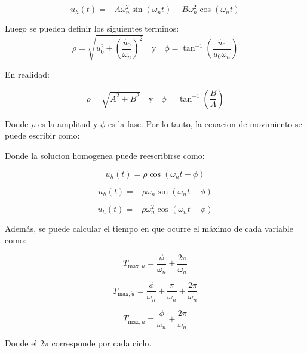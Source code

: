 \documentclass{article}  %
\begin{document}
\begin{equation}
    \ddot{u}_h(t) = -A \omega_n^2 \sin(\omega_n t) - B \omega_n^2 \cos(\omega_n t)
\end{equation}

Luego se pueden definir los siguientes terminos:
\begin{equation}
    \rho = \sqrt{u_0^2 + (\frac{\dot{u_0}}{\omega_n})^2} \quad \text{y} \quad \phi = \tan^{-1}(\frac{\dot{u_0}}{u_0 \omega_n})
\end{equation}

En realidad:

\begin{equation}
    \rho = \sqrt{A^2 + B^2} \quad \text{y} \quad \phi = \tan^{-1}(\frac{B}{A})
\end{equation}

Donde $\rho$ es la amplitud y $\phi$ es la fase. Por lo tanto, la ecuacion de movimiento se puede escribir como:

Donde la solucion homogenea puede reescribirse como:

\begin{equation}
    u_h(t) = \rho \cos(\omega_n t - \phi) 
\end{equation}

\begin{equation}
    \dot{u}_h(t) = -\rho \omega_n \sin(\omega_n t - \phi)
\end{equation}

\begin{equation}
    \ddot{u}_h(t) = -\rho \omega_n^2 \cos(\omega_n t - \phi)
\end{equation}

Además, se puede calcular el tiempo en que ocurre el máximo de cada variable como:

\begin{equation}
    T_{\text{max},u} = \frac{\phi}{\omega_n} + \frac{2\pi}{\omega_n}
\end{equation}

\begin{equation}
    T_{\text{max},\dot{u}} = \frac{\phi}{\omega_n} + \frac{\pi}{\omega_n} + \frac{2\pi}{\omega_n}
\end{equation}

\begin{equation}
    T_{\text{max},\ddot{u}} = \frac{\phi}{\omega_n} + \frac{2\pi}{\omega_n}
\end{equation}

Donde el $2\pi$ corresponde por cada ciclo.
\end{document}
